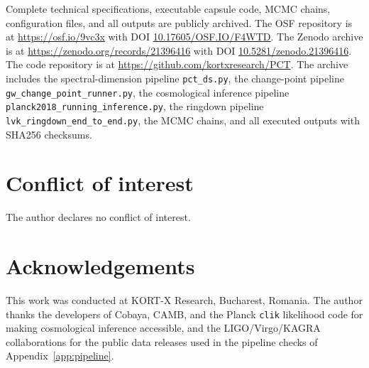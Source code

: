 ﻿\documentclass[12pt,a4paper]{article}
\theoremstyle{definition}
\begin{document}
Complete technical specifications, executable capsule code, MCMC chains, configuration files, and all outputs are publicly archived. The OSF repository is at \url{https://osf.io/9vc3x} with DOI \href{https://doi.org/10.17605/OSF.IO/F4WTD}{10.17605/OSF.IO/F4WTD}. The Zenodo archive is at \url{https://zenodo.org/records/21396416} with DOI \href{https://doi.org/10.5281/zenodo.21396416}{10.5281/zenodo.21396416}. The code repository is at \url{https://github.com/kortxresearch/PCT}. The archive includes the spectral-dimension pipeline \texttt{pct\_ds.py}, the change-point pipeline \texttt{gw\_change\_point\_runner.py}, the cosmological inference pipeline \texttt{planck2018\_running\_inference.py}, the ringdown pipeline \texttt{lvk\_ringdown\_end\_to\_end.py}, the MCMC chains, and all executed outputs with SHA256 checksums.

\section*{Conflict of interest}

The author declares no conflict of interest.

\section*{Acknowledgements}

This work was conducted at KORT-X Research, Bucharest, Romania. The author thanks the developers of Cobaya, CAMB, and the Planck \texttt{clik} likelihood code for making cosmological inference accessible, and the LIGO/Virgo/KAGRA collaborations for the public data releases used in the pipeline checks of Appendix~\ref{app:pipeline}.
\end{document}
